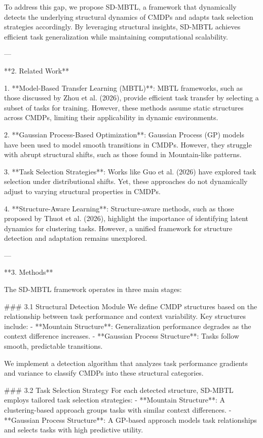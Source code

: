 To address this gap, we propose SD-MBTL, a framework that dynamically detects the underlying structural dynamics of CMDPs and adapts task selection strategies accordingly. By leveraging structural insights, SD-MBTL achieves efficient task generalization while maintaining computational scalability.

---

**2. Related Work**

1. **Model-Based Transfer Learning (MBTL)**: MBTL frameworks, such as those discussed by Zhou et al. (2026), provide efficient task transfer by selecting a subset of tasks for training. However, these methods assume static structures across CMDPs, limiting their applicability in dynamic environments.

2. **Gaussian Process-Based Optimization**: Gaussian Process (GP) models have been used to model smooth transitions in CMDPs. However, they struggle with abrupt structural shifts, such as those found in Mountain-like patterns.

3. **Task Selection Strategies**: Works like Guo et al. (2026) have explored task selection under distributional shifts. Yet, these approaches do not dynamically adjust to varying structural properties in CMDPs.

4. **Structure-Aware Learning**: Structure-aware methods, such as those proposed by Thuot et al. (2026), highlight the importance of identifying latent dynamics for clustering tasks. However, a unified framework for structure detection and adaptation remains unexplored.

---

**3. Methods**

The SD-MBTL framework operates in three main stages:

### 3.1 Structural Detection Module
We define CMDP structures based on the relationship between task performance and context variability. Key structures include:
- **Mountain Structure**: Generalization performance degrades as the context difference increases.
- **Gaussian Process Structure**: Tasks follow smooth, predictable transitions.

We implement a detection algorithm that analyzes task performance gradients and variance to classify CMDPs into these structural categories.

### 3.2 Task Selection Strategy
For each detected structure, SD-MBTL employs tailored task selection strategies:
- **Mountain Structure**: A clustering-based approach groups tasks with similar context differences.
- **Gaussian Process Structure**: A GP-based approach models task relationships and selects tasks with high predictive utility.

